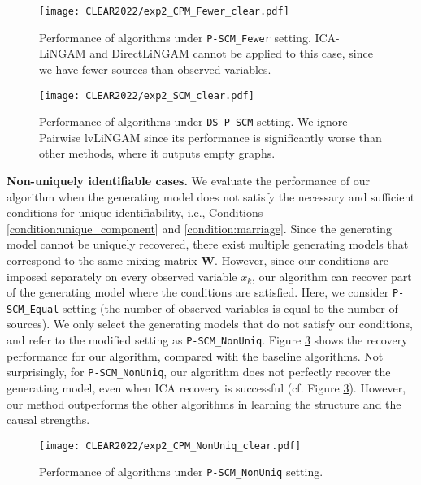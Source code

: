 \documentclass[12pt]{article}
\newcommand{\bW}{\mathbf{W}}
\begin{document}
\begin{figure}[t]
  \centering
  \texttt{[image: CLEAR2022/exp2\_CPM\_Fewer\_clear.pdf]}
  \caption{Performance of algorithms under \texttt{P-SCM\_Fewer} setting. ICA-LiNGAM and DirectLiNGAM cannot be applied to this case, since we have fewer sources than observed variables.}
  \label{fig:recovery2}
\end{figure}

\begin{figure}[t]
  \centering
  \texttt{[image: CLEAR2022/exp2\_SCM\_clear.pdf]}
  \caption{Performance of algorithms under \texttt{DS-P-SCM} setting. We ignore Pairwise lvLiNGAM since its performance is significantly worse than other methods, where it outputs empty graphs.}
  \label{fig:recovery3}
\end{figure}

\textbf{Non-uniquely identifiable cases. }
We evaluate the performance of our algorithm when the generating model does not satisfy the necessary and sufficient conditions for unique identifiability, i.e., Conditions \ref{condition:unique_component} and \ref{condition:marriage}. Since the generating model cannot be uniquely recovered, there exist multiple generating models that correspond to the same mixing matrix $\bW$. However, since our conditions are imposed separately on every observed variable $x_k$, our algorithm can recover part of the generating model where the conditions are satisfied. Here, we consider \texttt{P-SCM\_Equal} setting (the number of observed variables is equal to the number of sources). We only select the generating models that do not satisfy our conditions, and refer to the modified setting as \texttt{P-SCM\_NonUniq}. Figure \ref{fig:nonuniq} shows the recovery performance for our algorithm, compared with the baseline algorithms. Not surprisingly, for \texttt{P-SCM\_NonUniq}, our algorithm does not perfectly recover the generating model, even when ICA recovery is successful (cf. Figure \ref{fig:nonuniq}). 
However, our method outperforms the other algorithms in learning the structure and the causal strengths.

\begin{figure}[t]
  \centering
  \texttt{[image: CLEAR2022/exp2\_CPM\_NonUniq\_clear.pdf]}
  \caption{Performance of algorithms under \texttt{P-SCM\_NonUniq} setting.}
\label{fig:nonuniq}
\end{figure}
\end{document}
